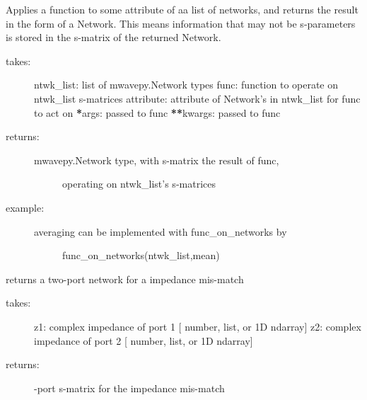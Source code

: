 \documentclass[letterpaper,10pt,english]{sphinxmanual}
\begin{document}
\begin{fulllineitems}
\label{api/mwavepy:mwavepy.network.func_on_networks}
Applies a function to some attribute of aa list of networks, and 
returns the result in the form of a Network. This means information 
that may not be s-parameters is stored in the s-matrix of the
returned Network.
\begin{description}
\item[{takes:}] \leavevmode
ntwk\_list: list of mwavepy.Network types
func: function to operate on ntwk\_list s-matrices
attribute: attribute of Network's  in ntwk\_list for func to act on
{\color{red}\bfseries{}*}args: passed to func
{\color{red}\bfseries{}**}kwargs: passed to func

\item[{returns:}] \leavevmode\begin{description}
\item[{mwavepy.Network type, with s-matrix the result of func, }] \leavevmode
operating on ntwk\_list's s-matrices

\end{description}

\item[{example:}] \leavevmode\begin{description}
\item[{averaging can be implemented with func\_on\_networks by }] \leavevmode
func\_on\_networks(ntwk\_list,mean)

\end{description}

\end{description}

\end{fulllineitems}


\begin{fulllineitems}
\label{api/mwavepy:mwavepy.network.impedance_mismatch}
returns a two-port network for a impedance mis-match
\begin{description}
\item[{takes:}] \leavevmode
z1: complex impedance of port 1 {[} number, list, or 1D ndarray{]}
z2: complex impedance of port 2 {[} number, list, or 1D ndarray{]}

\item[{returns:}] -port s-matrix for the impedance mis-match

\end{description}

\end{fulllineitems}
\end{document}
